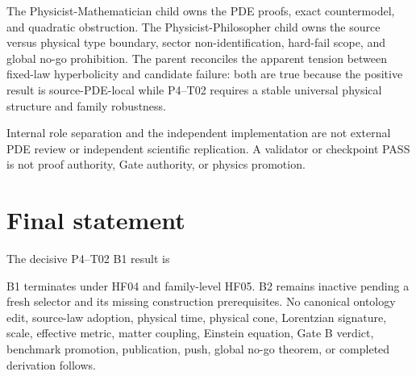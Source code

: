 \documentclass[11pt]{article}
\begin{document}
The Physicist-Mathematician child owns the PDE proofs, exact countermodel, and
quadratic obstruction.  The Physicist-Philosopher child owns the source versus
physical type boundary, sector non-identification, hard-fail scope, and global
no-go prohibition.  The parent reconciles the apparent tension between
fixed-law hyperbolicity and candidate failure: both are true because the
positive result is source-PDE-local while P4--T02 requires a stable universal
physical structure and family robustness.

Internal role separation and the independent implementation are not external
PDE review or independent scientific replication.  A validator or checkpoint
PASS is not proof authority, Gate authority, or physics promotion.

\section{Final statement}

The decisive P4--T02 B1 result is
\begin{center}
\end{center}
B1 terminates under HF04 and family-level HF05.  B2 remains inactive pending a
fresh selector and its missing construction prerequisites.  No canonical
ontology edit, source-law adoption, physical time, physical cone, Lorentzian
signature, scale, effective metric, matter coupling, Einstein equation, Gate
B verdict, benchmark promotion, publication, push, global no-go theorem, or
completed derivation follows.
\end{document}
